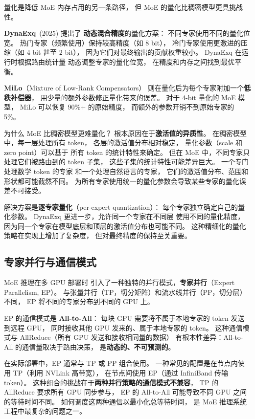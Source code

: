 量化是降低 MoE 内存占用的另一条路径，
但 MoE 的量化比稠密模型更具挑战性。

\textbf{DynaExq}~(2025) 提出了%
\textbf{动态混合精度}的量化方案：
不同专家使用不同的量化位宽。
热门专家（频繁使用）保持较高精度（如 8 bit），
冷门专家使用更激进的压缩（如 4 bit 甚至 2 bit），
因为它们对最终输出的贡献权重较小。
DynaExq 在运行时根据路由统计量
动态调整专家的量化位宽，
在精度和内存之间找到最优平衡。

\textbf{MiLo}（Mixture of Low-Rank Compensators）%
则在量化后为每个专家附加一个\textbf{低秩补偿器}，
用少量的额外参数修正量化带来的误差。
对于 4-bit 量化的 MoE 模型，
MiLo 可以恢复 90\%+ 的原始精度，
而额外的参数开销不到原始专家的 5\%。

为什么 MoE 比稠密模型更难量化？
根本原因在于\textbf{激活值的异质性}。
在稠密模型中，每一层处理所有 token，
各层的激活值分布相对稳定，
量化参数（scale 和 zero point）可以基于
所有 token 的统计特性来确定。
但在 MoE 中，不同专家只处理它们被路由到的 token 子集，
这些子集的统计特性可能差异巨大。
一个专门处理数学 token 的专家
和一个处理自然语言的专家，
它们的激活值分布、范围和形状都可能截然不同。
为所有专家使用统一的量化参数会导致某些专家的量化误差不可接受。

解决方案是\textbf{逐专家量化}（per-expert quantization）：
每个专家独立确定自己的量化参数。
DynaExq 更进一步，允许同一个专家在不同层
使用不同的量化精度，
因为同一个专家在模型底层和顶层的激活值分布也可能不同。
这种精细化的量化策略在实现上增加了复杂度，
但对最终精度的保持至关重要。

\subsection{专家并行与通信模式}

MoE 推理在多 GPU 部署时
引入了一种独特的并行模式，\textbf{专家并行}（Expert Parallelism, EP）。
与张量并行（TP，切分矩阵）和流水线并行（PP，切分层）不同，
EP 将不同的专家分布到不同的 GPU 上。

EP 的通信模式是 \textbf{All-to-All}：
每块 GPU 需要将不属于本地专家的 token 发送到远程 GPU，
同时接收其他 GPU 发来的、属于本地专家的 token。
这种通信模式与 AllReduce（所有 GPU 发送和接收相同量的数据）
有根本性差异：All-to-All 的通信量取决于路由决策，
是\textbf{动态的、不可预测的}。

在实际部署中，EP 通常与 TP 或 PP 组合使用。
一种常见的配置是在节点内使用 TP（利用 NVLink 高带宽），
在节点间使用 EP（通过 InfiniBand 传输 token）。
这种组合的挑战在于\textbf{两种并行策略的通信模式不兼容}，
TP 的 AllReduce 要求所有 GPU 同步参与，
EP 的 All-to-All 可能导致不同 GPU 之间的等待时间不同。
如何调度这两种通信以最小化总等待时间，
是 MoE 推理系统工程中最复杂的问题之一。

